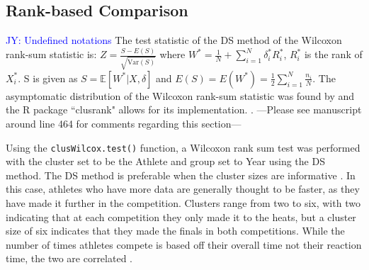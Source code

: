 \documentclass[12pt, letterpaper, titlepage]{article}
\newcommand{\jy}[1]{\textcolor{blue}{JY: #1}}
\begin{document}



\subsection{Rank-based Comparison}




\jy{Undefined notations}
The test statistic of the DS method of the Wilcoxon rank-sum statistic is:
$Z = \frac{S - E(S)}{\sqrt{\hat{\text{Var}}(S)}}$ where 
$W^* = \frac{1}{N} + \sum_{i=1}^{N} \delta_{i}^{*} R_{i}^{*}$, $R_{i}^{*}$ is
the rank of $X_{i}^{*}$. S is given as $S = \mathbb{E}[W^* | X, \delta]$ and
$E(S) = E(W^*) = \frac{1}{2} \sum_{i=1}^{N} \frac{n_i}{N}$.
The asymptomatic distribution of the Wilcoxon rank-sum statistic was found by
\citet{datta2005rank} and the R package ``clusrank" allows for its implementation.
\citep{jiang2017wilcoxon}.
---Please see manuscript around line 464 for comments regarding this section---











Using the \texttt{clusWilcox.test()} function, a Wilcoxon rank sum
test was performed with the cluster set to be the Athlete and group set to Year
using the DS method. The DS method is preferable when the cluster sizes are
informative \citep{jiang2017wilcoxon}.  In this case, athletes who have more
data are generally thought to be faster, as they have made it further in the
competition.  Clusters range from two to six, with two indicating that at each
competition they only made it to the heats, but a cluster size of six indicates
that they made the finals in both competitions.  While the number of times
athletes compete is based off their overall time not their reaction time, the
two are correlated \citep{delalija2008reaction}.
\end{document}
